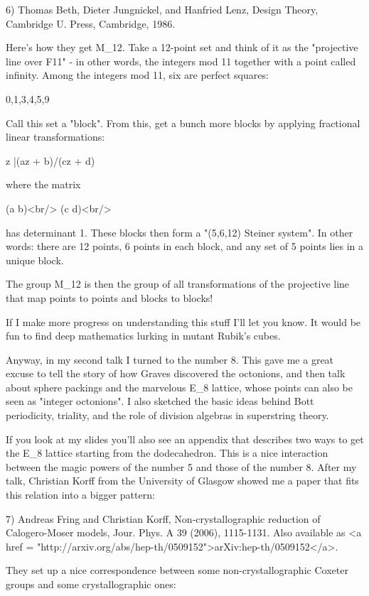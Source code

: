 6) Thomas Beth, Dieter Jungnickel, and Hanfried Lenz, Design Theory,
Cambridge U. Press, Cambridge, 1986.

Here's how they get M_{12}.  Take a 12-point set and think of it as
the "projective line over F11" - in other words, the integers mod 
11 together with a point called infinity.  Among the integers mod 11, 
six are perfect squares:

{0,1,3,4,5,9}

Call this set a "block".  From this, get a bunch more blocks
by applying fractional linear transformations:

z |\to  (az + b)/(cz + d)

where the matrix 

(a b)<br/>
(c d)<br/>

has determinant 1.
These blocks then form a "(5,6,12) Steiner system".  In other words: 
there are 12 points, 6 points in each block, and any set of 5 points 
lies in a unique block.  

The group M_{12} is then the group of all transformations of the 
projective line that map points to points and blocks to blocks!

If I make more progress on understanding this stuff I'll let you
know.  It would be fun to find deep mathematics lurking in mutant
Rubik's cubes.

Anyway, in my second talk I turned to the number 8.  This gave me a 
great excuse to tell the story of how Graves discovered the octonions, 
and then talk about sphere packings and the marvelous E_{8} lattice, 
whose points can also be seen as "integer octonions".   I also sketched
the basic ideas behind Bott periodicity, triality, and the role of 
division algebras in superstring theory.  

If you look at my slides you'll also see an appendix that describes two
ways to get the E_{8} lattice starting from the dodecahedron.   This is a 
nice interaction between the magic powers of the number 5 and those of 
the number 8.  After my talk, Christian Korff from the University of 
Glasgow showed me a paper that fits this relation into a bigger pattern:

7) Andreas Fring and Christian Korff, Non-crystallographic reduction
of Calogero-Moser models, Jour. Phys. A 39 (2006), 1115-1131.   Also 
available as <a href = "http://arxiv.org/abs/hep-th/0509152">arXiv:hep-th/0509152</a>.

They set up a nice correspondence between some non-crystallographic
Coxeter groups and some crystallographic ones:

